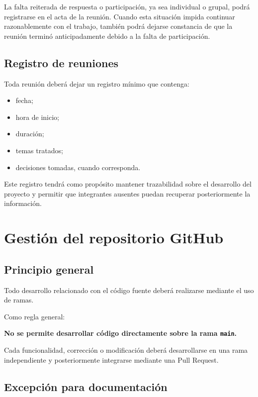 \documentclass[12pt,a4paper]{article}
\begin{document}
La falta reiterada de respuesta o participación, ya sea individual o grupal, podrá registrarse en el acta de la reunión. Cuando esta situación impida continuar razonablemente con el trabajo, también podrá dejarse constancia de que la reunión terminó anticipadamente debido a la falta de participación.

\subsection{Registro de reuniones}

Toda reunión deberá dejar un registro mínimo que contenga:

\begin{itemize}
    \item fecha;
    \item hora de inicio;
    \item duración;
    \item temas tratados;
    \item decisiones tomadas, cuando corresponda.
\end{itemize}

Este registro tendrá como propósito mantener trazabilidad sobre el desarrollo del proyecto y permitir que integrantes ausentes puedan recuperar posteriormente la información.

\section{Gestión del repositorio GitHub}

\subsection{Principio general}

Todo desarrollo relacionado con el código fuente deberá realizarse mediante el uso de ramas.

Como regla general:

\begin{center}
    \textbf{No se permite desarrollar código directamente sobre la rama \texttt{main}.}
\end{center}

Cada funcionalidad, corrección o modificación deberá desarrollarse en una rama independiente y posteriormente integrarse mediante una Pull Request.

\subsection{Excepción para documentación}
\end{document}
